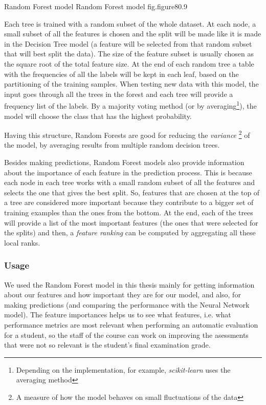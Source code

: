 %
    {Random Forest model}%
    {Random Forest model}%
    {fig.figure8}{0.9}

Each tree is trained with a random subset of the whole dataset. At each node, 
a small subset of all the features is chosen and the split will be made like 
it is made in the Decision Tree model (a feature will be selected from that 
random subset that will best split the data). The size of the feature 
subset is usually chosen as the square root of the total feature size. At the end of 
each random tree a table with the frequencies of all the labels will be kept 
in each leaf, based on the partitioning of the training samples. 
When testing new data with this model, the input goes through all the trees 
in the forest and each tree will provide a frequency list of the labels. 
By a majority voting method (or by averaging\footnote{Depending on the 
implementation, for example, {\it scikit-learn} uses the averaging method}), 
the model will choose the class that has the highest probability. 

Having this structure, Random Forests are good for reducing the {\it variance} 
\footnote{A measure of how the model behaves on small fluctuations of the data}
of the model, by averaging results from multiple random decision trees. 

Besides making predictions, Random Forest models also provide information about 
the importance of each feature in the prediction process. This is because each 
node in each tree works with a small random subset of all the features and 
selects the one that gives the best split. So, features that are chosen at the 
top of a tree are considered more important because they contribute to a bigger 
set of training examples than the ones from the bottom. At the end, each of the trees will 
provide a list of the most important features (the ones that were selected 
for the splits) and then, a {\it feature ranking} can be computed by aggregating 
all these local ranks. 

\subsubsection{Usage}

We used the Random Forest model in this thesis mainly for getting information 
about our features and how important they are for our model, and also, for 
making predictions (and comparing the performance with the Neural Network model). 
The feature importances helps us to see what features, i.e. what performance 
metrics are most relevant when performing an automatic evaluation for a student, 
so the staff of the course can work on improving the asessments that were not 
so relevant is the student's final examination grade.

